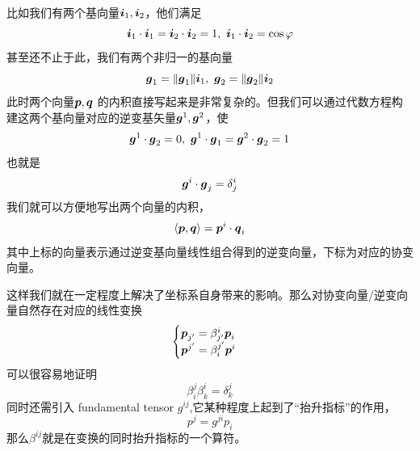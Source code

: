 \documentclass[12pt,a4paper,openany,twoside]{book}
\numberwithin{equation}{section}
\newcommand{\mean}[1]{\left\langle #1 \right\rangle}
\begin{document}
        比如我们有两个基向量$\vb*{i}_1,\vb*{i}_2$，他们满足
        \begin{equation*}
          \vb*{i}_1\cdot\vb*{i}_1=\vb*{i}_2\cdot\vb*{i}_2=1,\ \vb*{i}_1\cdot\vb*{i}_2=\cos{\varphi}
        \end{equation*} 
        甚至还不止于此，我们有两个非归一的基向量
        \begin{equation*}
          \vb*{g}_1=\norm{\vb*{g}_1}\vb*{i}_1,\ \vb*{g}_2=\norm{\vb*{g}_2}\vb*{i}_2
        \end{equation*} 
        此时两个向量$\vb*{p},\vb*{q}$ 的内积直接写起来是非常复杂的。但我们可以通过代数方程构建这两个基向量对应的逆变基矢量$\vb*{g}^1,\vb*{g}^2$，使
        \begin{equation*}
          \vb*{g}^1\cdot\vb*{g}_2=0,\ \vb*{g}^1\cdot\vb*{g}_1=\vb*{g}^2\cdot\vb*{g}_2=1 
        \end{equation*} 
        也就是
        \begin{equation*}
          \vb*{g}^i\cdot\vb*{g}_j=\delta^i_j
        \end{equation*}
        我们就可以方便地写出两个向量的内积，
        \begin{equation*}
          \mean{\vb*{p},\vb*{q}} = \vb*{p}^i \cdot \vb*{q}_i
        \end{equation*} 
        其中上标的向量表示通过逆变基向量线性组合得到的逆变向量，下标为对应的协变向量。

        这样我们就在一定程度上解决了坐标系自身带来的影响。那么对协变向量/逆变向量自然存在对应的线性变换
        \begin{equation*}
          \begin{cases}
            \vb*{p}_{j'} = \beta^{i}_{j'} \vb*{p}_i \\
            \vb*{p}^{j'} = \beta^{j'}_i\vb*{p}^i
          \end{cases}
        \end{equation*} 
        可以很容易地证明
        \begin{equation*}
          \beta^j_i\beta^i_k=\delta^j_k
        \end{equation*}
        同时还需引入 fundamental tensor $g^{ij}$,它某种程度上起到了“抬升指标”的作用，
        \begin{equation*}
          p^j=g^{ji}p_i
        \end{equation*} 
        那么$\beta^{ij}$就是在变换的同时抬升指标的一个算符。
\end{document}
